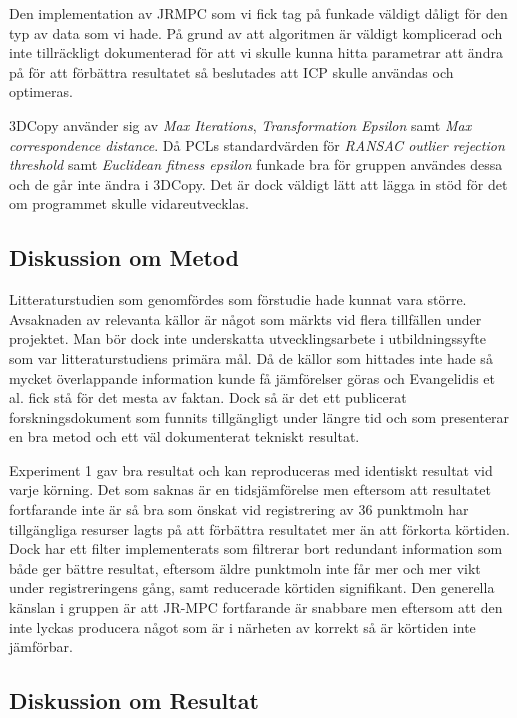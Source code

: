 Den implementation av JRMPC som vi fick tag på funkade väldigt dåligt för den typ av data som vi hade. På grund av att algoritmen är väldigt komplicerad och inte tillräckligt dokumenterad för att vi skulle kunna hitta parametrar att ändra på för att förbättra resultatet så beslutades att ICP skulle användas och optimeras.

3DCopy använder sig av \textit{Max Iterations}, \textit{Transformation Epsilon} samt \textit{Max correspondence distance}. Då PCLs standardvärden för \textit{RANSAC outlier rejection threshold} samt \textit{Euclidean fitness epsilon} funkade bra för gruppen användes dessa och de går inte ändra i 3DCopy. Det är dock väldigt lätt att lägga in stöd för det om programmet skulle vidareutvecklas.

\subsection{Diskussion om Metod}

Litteraturstudien som genomfördes som förstudie hade kunnat vara större. Avsaknaden av relevanta källor är något som märkts vid flera tillfällen under projektet. Man bör dock inte underskatta utvecklingsarbete i utbildningssyfte som var litteraturstudiens primära mål. Då de källor som hittades inte hade så mycket överlappande information kunde få jämförelser göras och Evangelidis et al. \cite{Evangelidis-ECCV-2014} fick stå för det mesta av faktan. Dock så är det ett publicerat forskningsdokument som funnits tillgängligt under längre tid och som presenterar en bra metod och ett väl dokumenterat tekniskt resultat.

Experiment 1 gav bra resultat och kan reproduceras med identiskt resultat vid varje körning. Det som saknas är en tidsjämförelse men eftersom att resultatet fortfarande inte är så bra som önskat vid registrering av 36 punktmoln har tillgängliga resurser lagts på att förbättra resultatet mer än att förkorta körtiden. Dock har ett filter implementerats som filtrerar bort redundant information som både ger bättre resultat, eftersom äldre punktmoln inte får mer och mer vikt under registreringens gång, samt reducerade körtiden signifikant. Den generella känslan i gruppen är att JR-MPC fortfarande är snabbare men eftersom att den inte lyckas producera något som är i närheten av korrekt så är körtiden inte jämförbar. 

\subsection{Diskussion om Resultat}

